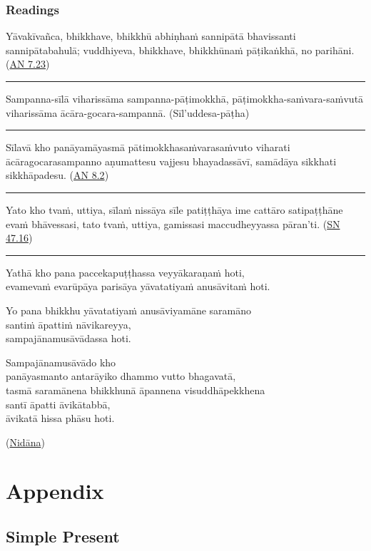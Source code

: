 \documentclass[11pt,oneside]{memoir}
\begin{document}
\subsection{Readings}
\label{sec:org55f28a6}

Yāvakīvañca, bhikkhave, bhikkhū abhiṇhaṁ sannipātā bhavissanti sannipātabahulā;
vuddhiyeva, bhikkhave, bhikkhūnaṁ pāṭikaṅkhā, no parihāni. (\href{https://suttacentral.net/an7.23/pli/ms}{AN 7.23})

\noindent\rule{\textwidth}{0.5pt}

Sampanna-sīlā viharissāma sampanna-pāṭimokkhā, pāṭimokkha-saṁvara-saṁvutā
viharissāma ācāra-gocara-sampannā. (Sīl'uddesa-pāṭha)

\noindent\rule{\textwidth}{0.5pt}

Sīlavā kho panāyamāyasmā pātimokkhasaṁvarasaṁvuto viharati ācāragocarasampanno
aṇumattesu vajjesu bhayadassāvī, samādāya sikkhati sikkhāpadesu. (\href{https://suttacentral.net/an8.2/pli/ms}{AN 8.2})

\noindent\rule{\textwidth}{0.5pt}

Yato kho tvaṁ, uttiya, sīlaṁ nissāya sīle patiṭṭhāya ime cattāro satipaṭṭhāne
evaṁ bhāvessasi, tato tvaṁ, uttiya, gamissasi maccudheyyassa pāran'ti. (\href{https://suttacentral.net/sn47.16/pli/ms}{SN 47.16})

\noindent\rule{\textwidth}{0.5pt}

Yathā kho pana paccekapuṭṭhassa veyyākaraṇaṁ hoti, \\[0pt]
evamevaṁ evarūpāya parisāya yāvatatiyaṁ anusāvitaṁ hoti.

Yo pana bhikkhu yāvatatiyaṁ anusāviyamāne saramāno \\[0pt]
santiṁ āpattiṁ nāvikareyya, \\[0pt]
sampajānamusāvādassa hoti.

Sampajānamusāvādo kho \\[0pt]
panāyasmanto antarāyiko dhammo vutto bhagavatā, \\[0pt]
tasmā saramānena bhikkhunā āpannena visuddhāpekkhena \\[0pt]
santī āpatti āvikātabbā, \\[0pt]
āvikatā hissa phāsu hoti.

(\href{https://suttacentral.net/pli-tv-bu-pm/pli/ms}{Nidāna})
\chapter{Appendix}
\label{sec:org372d4bb}
\section{Simple Present}
\label{sec:orga3e2c3e}
\end{document}
